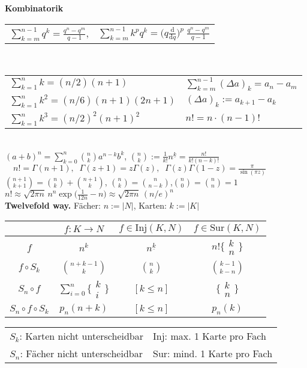 \documentclass[a4paper,10pt,fleqn,twoside,twocolumn,dvipdfmx]{scrartcl}
\newcommand{\strong}[1]{\textsf{\textbf{#1}}}
\newcommand{\ds}{\displaystyle}
\newcommand{\tsbrace}[2]{%
  \big\{\!\begin{smallmatrix}#1\\ #2\end{smallmatrix}\!\big\}}
\begin{document}
\noindent
\strong{Kombinatorik}\\[2pt]
\begin{tabular}{@{}ll}
$\ds{\textstyle\sum\limits_{k=m}^{n-1}} q^k = \frac{q^n-q^m}{q-1}$,
& $\ds{\textstyle\sum\limits_{k=m}^{n-1}} k^p q^k
= \Big(q\frac{\mathrm d}{\mathrm dq}\Big)^p\;\frac{q^n-q^m}{q-1}$
\end{tabular}\\[2pt]
\begin{tabular}{@{}l|l}
$\sum_{k=1}^n k = (n/2)(n+1)$ & $\sum_{k=m}^{n-1}(\Delta a)_k = a_n-a_m$\\
$\sum_{k=1}^n k^2 = (n/6)(n+1)(2n+1)$ & $(\Delta a)_k := a_{k+1}-a_k$\\
$\sum_{k=1}^n k^3 = (n/2)^2(n+1)^2$ & $n! = n\cdot (n-1)!$
\end{tabular}\\
$\ds (a+b)^n = {\textstyle\sum\limits_{k=0}^n} \binom{n}{k}a^{n-k} b^k$,\quad
$\ds\binom{n}{k} := \frac{1}{k!}n^{\underline k} = \frac{n!}{k!(n-k)!}$\\[4pt]
$\quad n!=\Gamma(n+1),\;\; \Gamma(z+1) = z\Gamma(z),\;\;
\Gamma(z)\Gamma(1-z) = \frac{\pi}{\sin(\pi z)}$\\[2pt]
$\binom{n+1}{k+1} = \binom{n}{k}+\binom{n+1}{k}$,\quad
$\binom{n}{k} = \binom{n}{n-k}$,\quad $\binom{n}{0} = \binom{n}{n} = 1$\\[4pt]
$n! \approx\sqrt{2\pi n}\,n^n \exp\big(\frac{1}{12n}-n\big)
\approx\sqrt{2\pi n}\,(n/e)^n$\\[4pt]
\strong{Twelvefold way.} Fächer: $n:=|N|$, Karten: $k:=|K|$\\
\begin{tabular}{@{}c|ccc@{}}
\toprule
& $f\colon K{\to}N$
& $f\in\mathrm{Inj}(K,N)$
& $f\in\mathrm{Sur}(K,N)$\\
\midrule
$f$
& $n^k$
& $n^{\underline k}$
& $n!\tsbrace{k}{n}$\\[2pt]
$f\circ S_k$
& $\binom{n+k-1}{k}$
& $\binom{n}{k}$
& $\binom{k-1}{k-n}$\\[2pt]
$S_n\circ f$
& $\sum_{i=0}^n\tsbrace{k}{i}$
& $[k\le n]$
& $\tsbrace{k}{n}$\\[2pt]
$S_n\circ f\circ S_k$
& $p_n(n+k)$
& $[k\le n]$
& $p_n(k)$\\
\bottomrule
\end{tabular}
{\small\begin{tabular}{@{}l|l}
$S_k$: Karten nicht unterscheidbar & $\mathrm{Inj}$: max. 1 Karte pro Fach\\
$S_n$: Fächer nicht unterscheidbar & $\mathrm{Sur}$: mind. 1 Karte pro Fach
\end{tabular}}\\[4pt]
\end{document}
